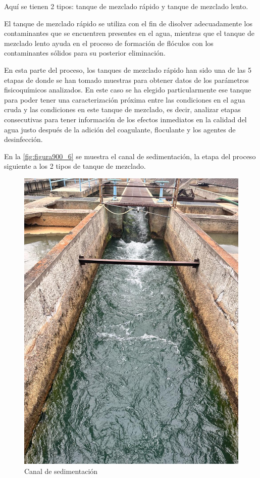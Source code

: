 Aquí se tienen 2 tipos: tanque de mezclado rápido y tanque de mezclado lento.

El tanque de mezclado rápido se utiliza con el fin de disolver adecuadamente los contaminantes que se encuentren presentes en el agua, mientras que el tanque de mezclado lento ayuda en el proceso de formación de flóculos 
con los contaminantes sólidos para su posterior eliminación.

En esta parte del proceso, los tanques de mezclado rápido han sido una de las 5 etapas de donde se han tomado muestras para obtener datos de los parámetros fisicoquímicos analizados. En este caso se ha elegido particularmente 
ese tanque para poder tener una caracterización próxima entre las condiciones en el agua cruda y las condiciones en este tanque de mezclado, es decir, analizar etapas consecutivas para tener información de los efectos inmediatos 
en la calidad del agua justo después de la adición del coagulante, floculante y los agentes de desinfección.


En la \autoref{fig:figura900_6} se muestra el canal de sedimentación, la etapa del proceso siguiente a los 2 tipos de tanque de mezclado.
\clearpage
\begin{figure}[h]
	\centering
	\includegraphics[scale=0.3,angle=0]{imgss17.jpg}
	\caption{Canal de sedimentación}
	\label{fig:figura900_6}
\end{figure}

